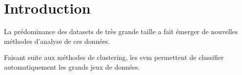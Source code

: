 \section{Introduction}

La prédominance des \gls{datasets} de très grande taille
a fait émerger de nouvelles méthodes d’analyse de ces données.

Faisant suite aux méthodes de clustering, les \gls{svm}
permettent de classifier automatiquement les grands jeux de données.

\pagebreak
